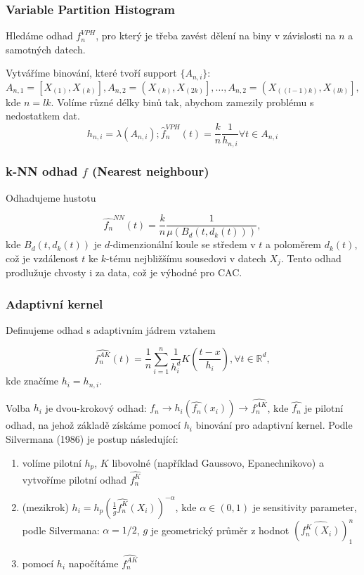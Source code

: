 \documentclass{article}
\theoremstyle{remark}
\theoremstyle{plain}
\theoremstyle{definition}
\theoremstyle{remark}
\begin{document}
\subsubsection{Variable Partition Histogram}

Hledáme odhad $f_n^{VPH}$, pro který je třeba zavést dělení na biny v závislosti na $n$ a samotných datech.

Vytváříme binování, které tvoří support $\{A_{n,i}\}:$ 
$$
A_{n,1} = \left[X_{(1)},X_{(k)}\right],
A_{n,2} = \left(X_{(k)},X_{(2k)}\right],
\dots,
A_{n,2} = \left(X_{((l-1)k)},X_{(lk)}\right],
$$
kde $n = lk$. Volíme různé délky binů tak, abychom zamezily problému s nedostatkem dat.
$$
h_{n,i} = \lambda(A_{n,i}); \hat{f}_n^{VPH}(t) = \frac{k}{n} \frac{1}{h_{n,i}} \forall t \in A_{n,i}
$$

\subsubsection{k-NN odhad $f$ (Nearest neighbour)}

Odhadujeme hustotu

$$
\hat{f_n}^{NN}(t) = \frac{k}{n} \frac{1}{\mu(B_d(t,d_k(t)))},$$
kde
$B_d(t,d_k(t))$ je $d$-dimenzionální koule se středem v $t$ a poloměrem $d_k(t)$, což je vzdálenost $t$ ke $k$-tému nejbližšímu sousedovi v datech $X_j$. Tento odhad prodlužuje chvosty i za data, což je výhodné pro CAC.

\subsubsection{Adaptivní kernel}

Definujeme odhad s adaptivním jádrem vztahem

$$
\hat{f_n^{AK}}(t) = \frac{1}{n} \sum_{i=1}^n \frac{1}{h_i^{d}} K\left(\frac{t-x}{h_i}\right), \forall t \in \mathbb{R}^d,
$$
kde značíme $h_i = h_{n,i}$.

Volba $h_i$ je dvou-krokový odhad: $\widehat{f_n} \rightarrow h_i(\widehat{f_n}(x_i)) \rightarrow \widehat{f_n^{AK}}$, kde $\hat{f_n}$ je pilotní odhad, na jehož základě získáme pomocí $h_i$ binování pro adaptivní kernel. Podle Silvermana (1986) je postup následující:

\begin{enumerate}
    \item volíme pilotní $h_p$, $K$ libovolné (například Gaussovo, Epanechnikovo) a vytvoříme pilotní odhad $\widehat{f_n^K}$
    \item (mezikrok) $h_i = h_p\left(\frac{1}{g}\widehat{f_n^K}(X_i)\right)^{-\alpha}$, kde $\alpha \in (0,1)$ je sensitivity parameter, podle Silvermana: $\alpha=1/2$, $g$ je geometrický průměr z hodnot $\left(\widehat{f_n^K(X_i)}\right)_1^n$
    \item pomocí $h_i$ napočítáme $\widehat{f_n^{AK}}$
\end{enumerate}
\end{document}
